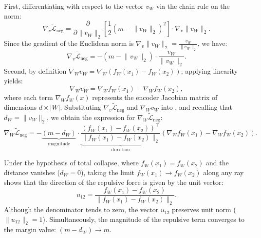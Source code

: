 \documentclass[11pt, oneside, openany]{book}
\begin{document}
First, differentiating with respect to the vector $v_{W}$ via the chain rule on the norm:
\begin{equation}
\label{eq:4.9}
\nabla_{v} \tilde{\mathcal{L}}_{\text{neg}} = \frac{\partial}{\partial \lVert v_{W} \rVert_{2}}\left[ \frac{1}{2}(m - \lVert v_{W} \rVert_{2})^{2} \right] \cdot \nabla_{v} \lVert v_{W} \rVert_{2}.
\end{equation}
Since the gradient of the Euclidean norm is $\nabla_{v} \lVert v_{W} \rVert_{2} = \frac{v_{W}}{\lVert v_{W} \rVert_{2}}$, we have:
\begin{equation}
\label{eq:4.10}
\nabla_{v} \tilde{\mathcal{L}}_{\text{neg}} = -(m - \lVert v_{W} \rVert_{2}) \cdot \frac{v_{W}}{\lVert v_{W} \rVert_{2}}.
\end{equation}
Second, by definition $\nabla_{W} v_{W} = \nabla_{W}(f_{W}(x_{1}) - f_{W}(x_{2}))$; applying linearity yields:
\begin{equation}
\label{eq:4.11}
\nabla_{W} v_{W} = \nabla_{W} f_{W}(x_{1}) - \nabla_{W} f_{W}(x_{2}),
\end{equation}
where each term $\nabla_{W} f_{W}(x)$ represents the encoder Jacobian matrix of dimensions $d \times |W|$. Substituting $\nabla_{v} \tilde{\mathcal{L}}_{\text{neg}}$ and $\nabla_{W} v_{W}$ into , and recalling that $d_{W} = \lVert v_{W} \rVert_{2}$, we obtain the expression for $\nabla_{W} \tilde{\mathcal{L}}_{\text{neg}}$:
\begin{equation}
\label{eq:4.12}
\nabla_{W} \tilde{\mathcal{L}}_{\text{neg}} = -\underbrace{(m - d_{W})}_{\text{magnitude}} \cdot \underbrace{\frac{(f_{W}(x_{1}) - f_{W}(x_{2}))^{\top}}{\lVert f_{W}(x_{1}) - f_{W}(x_{2}) \rVert_{2}}}_{\text{direction}} \left( \nabla_{W} f_{W}(x_{1}) - \nabla_{W} f_{W}(x_{2}) \right).
\end{equation}

Under the hypothesis of total collapse, where $f_{W}(x_{1}) = f_{W}(x_{2})$ and the distance vanishes ($d_{W} = 0$), taking the limit $f_{W}(x_{1}) \to f_{W}(x_{2})$ along any ray shows that the direction of the repulsive force is given by the unit vector:
\begin{equation}
\label{eq:4.13}
u_{12} = \frac{f_{W}(x_{1}) - f_{W}(x_{2})}{\lVert f_{W}(x_{1}) - f_{W}(x_{2}) \rVert_{2}}.
\end{equation}
Although the denominator tends to zero, the vector $u_{12}$ preserves unit norm ($\lVert u_{12} \rVert_{2} = 1$). Simultaneously, the magnitude of the repulsive term converges to the margin value: $(m - d_{W}) \to m$.
\end{document}
